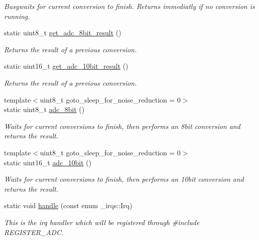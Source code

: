 \begin{DoxyCompactItemize}
\begin{DoxyCompactList}\small\item\em Busywaits for current conversion to finish. Returns immediatly if no conversion is running. \end{DoxyCompactList}\item 
static uint8\+\_\+t \hyperlink{classadc_1_1Adc_a780877e68b2f2d61596e594db04179ed}{get\+\_\+adc\+\_\+8bit\+\_\+result} ()
\begin{DoxyCompactList}\small\item\em Returns the result of a previous conversion. \end{DoxyCompactList}\item 
static uint16\+\_\+t \hyperlink{classadc_1_1Adc_a4b6ffdcd526be74e01f39329a5f25d20}{get\+\_\+adc\+\_\+10bit\+\_\+result} ()
\begin{DoxyCompactList}\small\item\em Returns the result of a previous conversion. \end{DoxyCompactList}\item 
{\footnotesize template$<$uint8\+\_\+t goto\+\_\+sleep\+\_\+for\+\_\+noise\+\_\+reduction = 0$>$ }\\static uint8\+\_\+t \hyperlink{classadc_1_1Adc_ae289bfed72b4cfab79dae680cc4d9ab4}{adc\+\_\+8bit} ()
\begin{DoxyCompactList}\small\item\em Waits for current conversions to finish, then performs an 8bit conversion and returns the result. \end{DoxyCompactList}\item 
{\footnotesize template$<$uint8\+\_\+t goto\+\_\+sleep\+\_\+for\+\_\+noise\+\_\+reduction = 0$>$ }\\static uint16\+\_\+t \hyperlink{classadc_1_1Adc_a3d9614e14e56b6f7209040710ef6f022}{adc\+\_\+10bit} ()
\begin{DoxyCompactList}\small\item\em Waits for current conversions to finish, then performs an 10bit conversion and returns the result. \end{DoxyCompactList}\item 
static void \hyperlink{classadc_1_1Adc_a66fe99e252da5f9239501ae81cfdf5e5}{handle} (const enum \+\_\+irqs\+::\+Irq)
\begin{DoxyCompactList}\small\item\em This is the irq handler which will be registered through {\ttfamily \#include R\+E\+G\+I\+S\+T\+E\+R\+\_\+\+A\+DC}. \end{DoxyCompactList}\end{DoxyCompactItemize}


